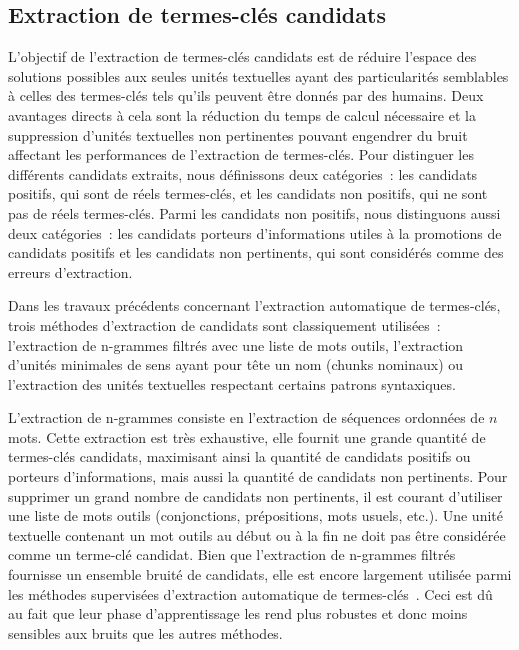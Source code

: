   \subsection{Extraction de termes-clés candidats}
  \label{subsec:extraction_de_termes_cles_candidats}
    L'objectif de l'extraction de termes-clés candidats est de réduire l'espace
    des solutions possibles aux seules unités textuelles ayant des
    particularités semblables à celles des termes-clés tels qu'ils peuvent être
    donnés par des humains. Deux avantages directs à cela sont la réduction du
    temps de calcul nécessaire et la suppression d'unités textuelles non
    pertinentes pouvant engendrer du bruit affectant les performances de
    l'extraction de termes-clés. Pour distinguer les différents candidats
    extraits, nous définissons deux catégories~: les candidats positifs, qui
    sont de réels termes-clés, et les candidats non positifs, qui ne sont pas de
    réels termes-clés. Parmi les candidats non positifs, nous distinguons aussi
    deux catégories~: les candidats porteurs d'informations utiles à la
    promotions de candidats positifs et les candidats non pertinents, qui sont
    considérés comme des erreurs d'extraction.

    Dans les travaux précédents concernant l'extraction automatique de
    termes-clés, trois méthodes d'extraction de candidats sont classiquement
    utilisées~: l'extraction de n-grammes filtrés avec une liste de mots outils,
    l'extraction d'unités minimales de sens ayant pour tête un nom (chunks
    nominaux) ou l'extraction des unités textuelles respectant certains patrons
    syntaxiques.

    L'extraction de n-grammes consiste en l'extraction de séquences ordonnées
    de $n$ mots. Cette extraction est très exhaustive, elle fournit une grande
    quantité de termes-clés candidats, maximisant ainsi la quantité de
    candidats positifs ou porteurs d'informations, mais aussi la quantité de
    candidats non pertinents. Pour supprimer un grand nombre de candidats non
    pertinents, il est courant d'utiliser une liste de mots outils
    (conjonctions, prépositions, mots usuels, etc.). Une unité textuelle
    contenant un mot outils au début ou à la fin ne doit pas être considérée
    comme un terme-clé candidat. Bien que l'extraction de n-grammes filtrés
    fournisse un ensemble bruité de candidats, elle est encore largement
    utilisée parmi les méthodes supervisées d'extraction automatique de
    termes-clés~\cite{witten1999kea,turney1999learningalgorithms,hulth2003keywordextraction}.
    Ceci est dû au fait que leur phase d'apprentissage les rend plus robustes et
    donc moins sensibles aux bruits que les autres méthodes.

